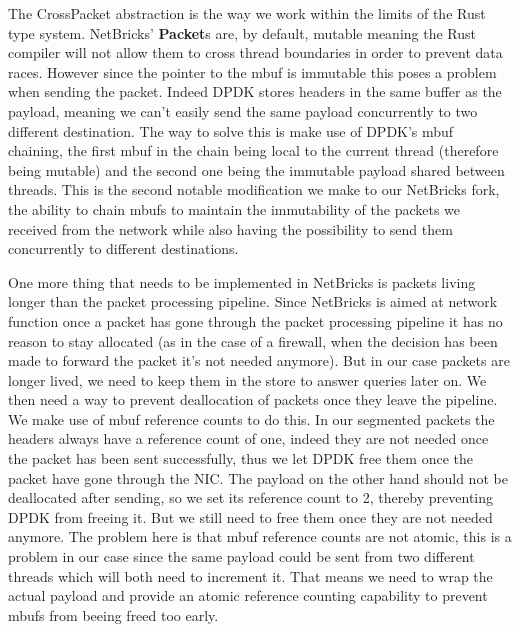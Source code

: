

The CrossPacket abstraction is the way we work within the limits of
the Rust type system. NetBricks' \textbf{Packet}s are, by default,
mutable meaning the Rust compiler will not allow them to cross thread
boundaries in order to prevent data races. However since the
pointer to the mbuf is immutable this poses a problem when sending the
packet. Indeed DPDK stores headers in the same buffer as the payload,
meaning we can't easily send the same payload concurrently to two
different destination. The way to solve this is make use of DPDK's
mbuf chaining, the first mbuf in the chain being local to the current
thread (therefore being mutable) and the second one being the
immutable payload shared between threads. This is the second notable
modification we make to our NetBricks fork, the ability to chain mbufs
to maintain the immutability of the packets we received from the
network while also having the possibility to send them concurrently to
different destinations.

One more thing that needs to be implemented in NetBricks is packets
living longer than the packet processing pipeline. Since NetBricks is
aimed at network function once a packet has gone through the packet
processing pipeline it has no reason to stay allocated (as in the case
of a firewall, when the decision has been made to forward the packet
it's not needed anymore). But in our case packets are longer lived, we
need to keep them in the store to answer queries later on. We then
need a way to prevent deallocation of packets once they leave the
pipeline. We make use of mbuf reference counts to do this. In our
segmented packets the headers always have a reference count of one,
indeed they are not needed once the packet has been sent successfully,
thus we let DPDK free them once the packet have gone through the
NIC\@. The payload on the other hand should not be deallocated after
sending, so we set its reference count to 2, thereby preventing DPDK
from freeing it. But we still need to free them once they are not
needed anymore. The problem here is that mbuf reference counts are not
atomic, this is a problem in our case since the same payload could be
sent from two different threads which will both need to increment
it. That means we need to wrap the actual payload and provide an
atomic reference counting capability to prevent mbufs from beeing
freed too early.

